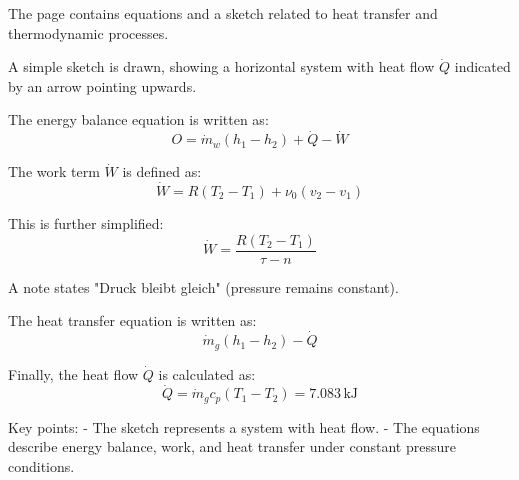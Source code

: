 The page contains equations and a sketch related to heat transfer and thermodynamic processes.  

A simple sketch is drawn, showing a horizontal system with heat flow \( \dot{Q} \) indicated by an arrow pointing upwards.  

The energy balance equation is written as:  
\[
O = \dot{m}_w (h_1 - h_2) + \dot{Q} - \dot{W}
\]  

The work term \( \dot{W} \) is defined as:  
\[
\dot{W} = R(T_2 - T_1) + \nu_0 (v_2 - v_1)
\]  

This is further simplified:  
\[
\dot{W} = \frac{R(T_2 - T_1)}{\tau - n}
\]  

A note states "Druck bleibt gleich" (pressure remains constant).  

The heat transfer equation is written as:  
\[
\dot{m}_g (h_1 - h_2) - \dot{Q}
\]  

Finally, the heat flow \( \dot{Q} \) is calculated as:  
\[
\dot{Q} = \dot{m}_g c_p (T_1 - T_2) = 7.083 \, \text{kJ}
\]  

Key points:  
- The sketch represents a system with heat flow.  
- The equations describe energy balance, work, and heat transfer under constant pressure conditions.